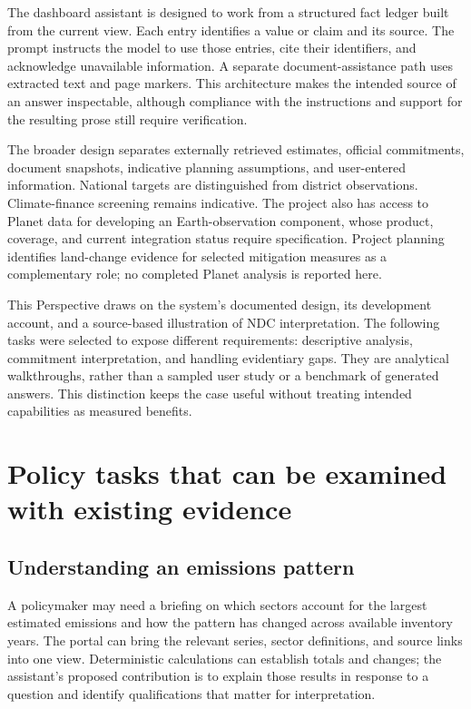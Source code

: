 \documentclass[11pt]{article}
\begin{document}
The dashboard assistant is designed to work from a structured fact ledger built from the current view. Each entry identifies a value or claim and its source. The prompt instructs the model to use those entries, cite their identifiers, and acknowledge unavailable information. A separate document-assistance path uses extracted text and page markers. This architecture makes the intended source of an answer inspectable, although compliance with the instructions and support for the resulting prose still require verification.

The broader design separates externally retrieved estimates, official commitments, document snapshots, indicative planning assumptions, and user-entered information. National targets are distinguished from district observations. Climate-finance screening remains indicative. The project also has access to Planet data for developing an Earth-observation component, whose product, coverage, and current integration status require specification. Project planning identifies land-change evidence for selected mitigation measures as a complementary role; no completed Planet analysis is reported here.

This Perspective draws on the system's documented design, its development account, and a source-based illustration of NDC interpretation. The following tasks were selected to expose different requirements: descriptive analysis, commitment interpretation, and handling evidentiary gaps. They are analytical walkthroughs, rather than a sampled user study or a benchmark of generated answers. This distinction keeps the case useful without treating intended capabilities as measured benefits.

\section*{Policy tasks that can be examined with existing evidence}

\subsection*{Understanding an emissions pattern}

A policymaker may need a briefing on which sectors account for the largest estimated emissions and how the pattern has changed across available inventory years. The portal can bring the relevant series, sector definitions, and source links into one view. Deterministic calculations can establish totals and changes; the assistant's proposed contribution is to explain those results in response to a question and identify qualifications that matter for interpretation.
\end{document}
